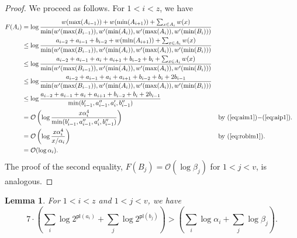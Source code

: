 \documentclass[11pt]{article}
\newcommand{\ens}[1]{\ensuremath{#1}}
\newcommand{\lasta}{z}
\newcommand{\lastb}{v}
\newcommand{\intmax}[1]{\ensuremath{\max(\intl #1)}}
\newcommand{\intmin}[1]{\ensuremath{\min(\intl #1)}}
\newcommand{\intl}[1]{\ensuremath{#1}}
\newcommand{\nodeweight}[1]{{\ensuremath{w(\node #1)}}}
\newcommand{\nodenewweight}[1]{{\ensuremath{w'(\node #1)}}}
\newcommand{\node}[1]{\ensuremath{#1}}
\newcommand{\agap}[1]{\ensuremath{a_{#1}}}
\newcommand{\bgap}[1]{\ensuremath{b_{#1}}}
\newcommand{\leftof}[1]{\ensuremath{\gap #1'}}
\newcommand{\rightof}[1]{\ensuremath{\gap #1''}}
\newcommand{\intfun}[1]{\ensuremath{F(\intl #1)}}
\newcommand{\gap}[1]{\ensuremath{#1}}
\newcommand{\potlossa}[1]{\ens{\mathsf{pl}(\agap{#1})}}
\newcommand{\potlossb}[1]{\ens{\mathsf{pl}(\bgap{#1})}}
\newcommand{\maxpotlossa}[1]{\ensuremath{\alpha_{#1}}}
\newcommand{\maxpotlossb}[1]{\ensuremath{\beta_{#1}}}
\newcounter{count}
\newtheorem{lemma}[count]{Lemma}
\begin{document}
\begin{proof}
We proceed as follows. For $1<i<z$, we have 
{\allowdisplaybreaks 
\begin{align*} 
\intfun{A_i} 
&= 
\log
\frac
{\nodeweight{\intmax{A_{i-1}}}+\nodeweight{\intmin{A_{i+1}}} + \sum_{\node x\in \intl A_i}{\nodeweight x}}{\min(\nodenewweight{\intmax{{B_{i-1}}}}, \nodenewweight{\intmin{{A_i}}}, \nodenewweight{\intmax{{A_i}}}, \nodenewweight{\intmin{{B_{i}}}})}
\\ 
&\leq 
\log
\frac
{\gap a_{i-2} +\gap a_{i-1} + \gap b_{i-2}+\nodeweight{\intmin{A_{i+1}}} + \sum_{\node x\in \intl A_i}{\nodeweight x}}{\min(\nodenewweight{\intmax{{B_{i-1}}}}, \nodenewweight{\intmin{{A_i}}}, \nodenewweight{\intmax{{A_i}}}, \nodenewweight{\intmin{{B_{i}}}})}
\\
&\leq 
\log
\frac
{\gap a_{i-2} +\gap a_{i-1} +\gap a_i + \gap a_{i+1} + \gap b_{i-2}+ \gap b_{i}+ \sum_{\node x\in \intl A_i}{\nodeweight x}}{\min(\nodenewweight{\intmax{{B_{i-1}}}}, \nodenewweight{\intmin{{A_i}}}, \nodenewweight{\intmax{{A_i}}}, \nodenewweight{\intmin{{B_{i}}}})}
\\
&\leq 
\log
\frac{\gap a_{i-2} +\gap a_{i-1} +\gap a_i + \gap a_{i+1} + \gap b_{i-2}+ \gap b_{i} + \gap 2b_{i-1}}
{\min(\nodenewweight{\intmax{{B_{i-1}}}}, \nodenewweight{\intmin{{A_i}}}, \nodenewweight{\intmax{{A_i}}}, \nodenewweight{\intmin{{B_{i}}}})}
\\
&\leq 
\log
\frac{\gap a_{i-2} +\gap a_{i-1} +\gap a_i + \gap a_{i+1} + \gap b_{i-2}+ \gap b_{i}+ \gap 2b_{i-1}}
{\min(\leftof{b_{i-1}}, \rightof{a_{i-1}}, \leftof{a_i},\rightof{b_{i-1}})}
\\ 
&= 
\mathcal O\left(
\log\frac{x\maxpotlossa i^4}{\min(\leftof{b_{i-1}}, \rightof{a_{i-1}}, \leftof{a_i},\rightof{b_{i-1}})}
\right)
&&\mbox{by (\ref{eq:aim1})$-$(\ref{eq:aip1}).}
\\ 
&= \mathcal O\left(\log\frac{x\maxpotlossa i^4}{x/\maxpotlossa i}\right)&&\mbox{by (\ref{eq:robim1})}.\\ 
&= \mathcal O(\log \maxpotlossa i). 
\end{align*} 
} 
The proof of the second equality, $\intfun{B_j} = \mathcal O(\log \maxpotlossb j)$ for $1<j<\lastb$, is analogous. 

\end{proof} 



\begin{lemma} 
\label{lem:maxmappingbound} 
For $1< i < \lasta$ and $1< j < \lastb$, we have 
\[ 
7\cdot\left(\sum_i \log 2^{\potlossa i}+ \sum_j \log 2^{\potlossb j}\right) > \left(\sum_i \log\maxpotlossa i + \sum_j \log\maxpotlossb j\right). 
\] 
\end{lemma} 
\end{document}
